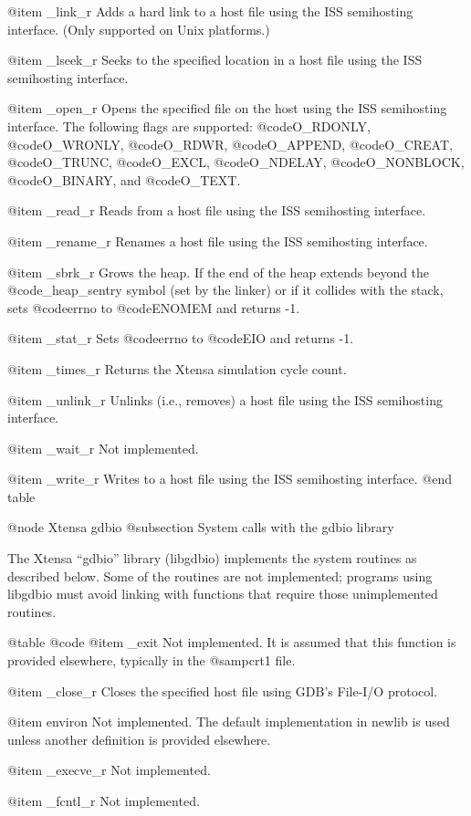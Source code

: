 @item _link_r
Adds a hard link to a host file using the ISS semihosting interface.
(Only supported on Unix platforms.)

@item _lseek_r
Seeks to the specified location in a host file using the ISS semihosting 
interface.

@item _open_r
Opens the specified file on the host using the ISS semihosting
interface.  The following flags are supported: @code{O_RDONLY},
@code{O_WRONLY}, @code{O_RDWR}, @code{O_APPEND}, @code{O_CREAT},
@code{O_TRUNC}, @code{O_EXCL}, @code{O_NDELAY}, @code{O_NONBLOCK},
@code{O_BINARY}, and @code{O_TEXT}.

@item _read_r
Reads from a host file using the ISS semihosting interface.

@item _rename_r
Renames a host file using the ISS semihosting interface.

@item _sbrk_r
Grows the heap.  If the end of the heap extends beyond the
@code{_heap_sentry} symbol (set by the linker) or if it collides with
the stack, sets @code{errno} to @code{ENOMEM} and returns -1.

@item _stat_r
Sets @code{errno} to @code{EIO} and returns -1.

@item _times_r
Returns the Xtensa simulation cycle count.

@item _unlink_r
Unlinks (i.e., removes) a host file using the ISS semihosting interface.

@item _wait_r
Not implemented.

@item _write_r
Writes to a host file using the ISS semihosting interface.
@end table

@node Xtensa gdbio
@subsection System calls with the gdbio library

The Xtensa ``gdbio'' library (libgdbio) implements the system routines as
described below.  Some of the routines are not implemented; programs using
libgdbio must avoid linking with functions that require those unimplemented
routines.

@table @code
@item _exit
Not implemented. It is assumed that this function is provided elsewhere,
typically in the @samp{crt1} file.

@item _close_r
Closes the specified host file using GDB's File-I/O protocol.

@item environ
Not implemented. The default implementation in newlib is used unless
another definition is provided elsewhere.

@item _execve_r
Not implemented.

@item _fcntl_r
Not implemented.

